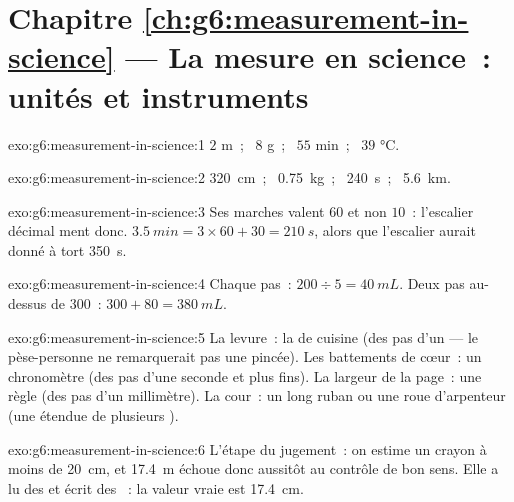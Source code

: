\section*{Chapitre \ref{ch:g6:measurement-in-science} --- La mesure en science~: unités et instruments}

\begin{solution}{exo:g6:measurement-in-science:1}
$2$ \unit{m}~; \ $8$ \unit{g}~; \ $55$ \unit{min}~; \ $39$
\unit{\celsius}.
\end{solution}

\begin{solution}{exo:g6:measurement-in-science:2}
\qty{320}{cm}~; \ \qty{0.75}{kg}~; \ \qty{240}{s}~; \ \qty{5.6}{km}.
\end{solution}

\begin{solution}{exo:g6:measurement-in-science:3}
Ses marches valent $60$ et non $10$~: l'escalier décimal ment donc.
$\qty{3.5}{min} = 3 \times 60 + 30 = \qty{210}{s}$, alors que
l'escalier aurait donné à tort \qty{350}{s}.
\end{solution}

\begin{solution}{exo:g6:measurement-in-science:4}
Chaque pas~: $200 \div 5 = \qty{40}{mL}$. Deux pas au-dessus de
$300$~: $300 + 80 = \qty{380}{mL}$.
\end{solution}

\begin{solution}{exo:g6:measurement-in-science:5}
La levure~: la  de cuisine (des pas d'un  --- le
pèse-personne ne remarquerait pas une pincée). Les battements de
cœur~: un chronomètre (des pas d'une seconde et plus fins). La
largeur de la page~: une règle (des pas d'un millimètre). La cour~:
un long  ruban ou une roue d'arpenteur (une étendue de plusieurs
).
\end{solution}

\begin{solution}{exo:g6:measurement-in-science:6}
L'étape du jugement~: on estime un crayon à moins de \qty{20}{cm},
et \qty{17.4}{m} échoue donc aussitôt au contrôle de bon sens. Elle a
lu des  et écrit des ~: la valeur vraie est
\qty{17.4}{cm}.
\end{solution}

